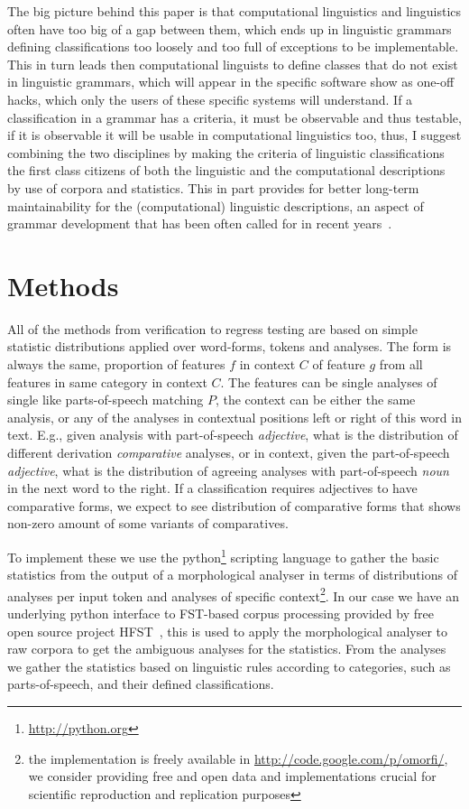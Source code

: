 \documentclass[a5paper]{article}
\begin{document}
The big picture behind this paper is that computational linguistics and
linguistics often have too big of a gap between them, which ends up in
linguistic grammars defining classifications too loosely and too full of
exceptions to be implementable. This in turn leads then computational linguists
to define classes that do not exist in linguistic grammars, which will appear
in the specific software show as one-off hacks, which only the users of these
specific systems will understand. If a classification in a grammar has a
criteria, it must be observable and thus testable, if it is observable it will
be usable in computational linguistics too, thus, I suggest combining the two
disciplines by making the criteria of linguistic classifications the first
class citizens of both the linguistic and the computational descriptions by use
of corpora and statistics.  This in part provides for better long-term
maintainability for the (computational) linguistic descriptions, an aspect of
grammar development that has been often called for in recent years~\cite{maxwell2013system,maxwell2008joint,moshagen2013building,pirinen2011modularisation}.

\section{Methods}

All of the methods from verification to regress testing are based on simple
statistic distributions applied over word-forms, tokens and analyses. The form
is always the same, proportion of features $f$ in context $C$ of feature $g$ 
from all features in same category in context $C$. The features can be 
single analyses of single like parts-of-speech matching $P$, the context can
be either the same analysis, or any of the analyses in contextual positions
left or right of this word in text. E.g., given analysis with part-of-speech
\emph{adjective}, what is the distribution of different derivation
\emph{comparative} analyses, or in context, given the part-of-speech
\emph{adjective}, what is the distribution of agreeing analyses with
part-of-speech \emph{noun} in the next word to the right. If a classification
requires adjectives to have comparative forms, we expect to see distribution of
comparative forms that shows non-zero amount of some variants of comparatives.

To implement these we use the python\footnote{\url{http://python.org}}
scripting language to gather the basic statistics from the output of a
morphological analyser in terms of distributions of analyses per input token
and analyses of specific context\footnote{the implementation is freely
available in \url{http://code.google.com/p/omorfi/}, we consider providing free and open data and
implementations crucial for scientific reproduction and replication purposes}.
In our case we have an underlying python interface to FST-based corpus
processing provided by free open source project HFST~\cite{linden2013hfst},
this is used to apply the morphological analyser to raw corpora to get the
ambiguous analyses for the statistics. From the analyses we gather the
statistics based on linguistic rules according to categories, such as
parts-of-speech, and their defined classifications.
\end{document}
